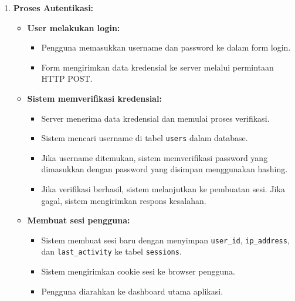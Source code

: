 \documentclass[a4paper]{report}
\begin{document}
\begin{enumerate}
\item \textbf{Proses Autentikasi:}
    \begin{itemize}
    \item \textbf{User melakukan login:}
        \begin{itemize}
        \item Pengguna memasukkan username dan password ke dalam form login.
        \item Form mengirimkan data kredensial ke server melalui permintaan HTTP POST.
        \end{itemize}
    \item \textbf{Sistem memverifikasi kredensial:}
        \begin{itemize}
        \item Server menerima data kredensial dan memulai proses verifikasi.
        \item Sistem mencari username di tabel \texttt{users} dalam database.
        \item Jika username ditemukan, sistem memverifikasi password yang dimasukkan 
        dengan password yang disimpan menggunakan hashing.
        \item Jika verifikasi berhasil, sistem melanjutkan ke pembuatan sesi. Jika gagal, 
        sistem mengirimkan respons kesalahan.
        \end{itemize}
    \item \textbf{Membuat sesi pengguna:}
        \begin{itemize}
        \item Sistem membuat sesi baru dengan menyimpan \texttt{user\_id}, 
        \texttt{ip\_address}, dan \texttt{last\_activity} ke tabel \texttt{sessions}.
        \item Sistem mengirimkan cookie sesi ke browser pengguna.
        \item Pengguna diarahkan ke dashboard utama aplikasi.
        \end{itemize}
    \end{itemize}


\end{enumerate}
\end{document}
